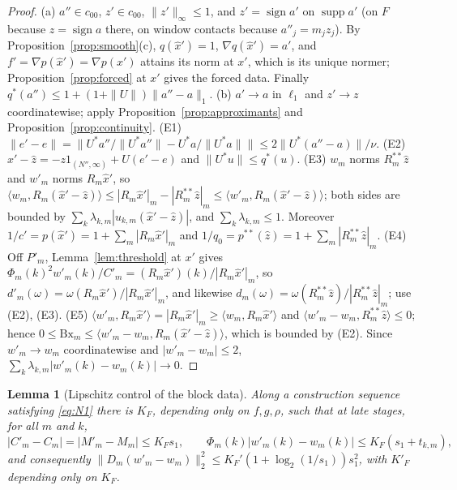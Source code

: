 \documentclass[10pt]{amsart}
\newtheorem{lemma}[theorem]{Lemma}
\theoremstyle{definition}
\theoremstyle{remark}
\newcommand{\supp}{\operatorname{supp}}
\newcommand{\sgn}{\operatorname{sign}}
\newcommand{\zh}{\hat z}
\newcommand{\ip}[2]{\langle #1,#2\rangle}
\begin{document}
\begin{proof}
(a) $a''\in c_{00}$, $z'\in c_{00}$, $\|z'\|_\infty\le1$, and $z'=\sgn a'$ on
$\supp a'$ (on $F$ because $z=\sgn a$ there, on window contacts because
$a''_j=m_jz_j$).  By Proposition~\ref{prop:smooth}(c), $q(\hat x')=1$,
$\nabla q(\hat x')=a'$, and $f'=\nabla p(\hat x')=\nabla p(x')$ attains its
norm at $x'$, which is its unique normer; Proposition~\ref{prop:forced} at
$x'$ gives the forced data.  Finally $q^*(a'')\le1+(1+\|U\|)\|a''-a\|_1$.
(b) $a'\to a$ in $\ell_1$ and $z'\to z$ coordinatewise; apply
Proposition~\ref{prop:approximants} and Proposition~\ref{prop:continuity}.
(E1) $\|e'-e\|=\|U^*a''/\|U^*a''\|-U^*a/\|U^*a\|\|\le2\|U^*(a''-a)\|/\nu$.
(E2) $\hat x'-\zh=-z1_{(N'',\infty)}+U(e'-e)$ and $\|U^*u\|\le q^*(u)$.
(E3) $w_m$ norms $R_m^{**}\zh$ and $w'_m$ norms $R_m\hat x'$, so
$\ip{w_m}{R_m(\hat x'-\zh)}\le|R_m\hat x'|_m-|R^{**}_m\zh|_m\le
\ip{w'_m}{R_m(\hat x'-\zh)}$; both sides are bounded by
$\sum_k\lambda_{k,m}|u_{k,m}(\hat x'-\zh)|$, and $\sum_k\lambda_{k,m}\le1$.
Moreover $1/c'=p(\hat x')=1+\sum_m|R_m\hat x'|_m$ and $1/q_0=p^{**}(\zh)=
1+\sum_m|R^{**}_m\zh|_m$.
(E4) Off $P'_m$, Lemma~\ref{lem:threshold} at $x'$ gives
$\Phi_m(k)^2w'_m(k)/C'_m=(R_m\hat x')(k)/|R_m\hat x'|_m$, so
$d'_m(\omega)=\omega(R_m\hat x')/|R_m\hat x'|_m$, and likewise
$d_m(\omega)=\omega(R^{**}_m\zh)/|R^{**}_m\zh|_m$; use (E2), (E3).
(E5) $\ip{w'_m}{R_m\hat x'}=|R_m\hat x'|_m\ge\ip{w_m}{R_m\hat x'}$ and
$\ip{w'_m-w_m}{R_m^{**}\zh}\le0$; hence $0\le\mathrm{Bx}_m\le
\ip{w'_m-w_m}{R_m(\hat x'-\zh)}$, which is bounded by (E2).  Since
$w'_m\to w_m$ coordinatewise and $|w'_m-w_m|\le2$,
$\sum_k\lambda_{k,m}|w'_m(k)-w_m(k)|\to0$.
\end{proof}

\begin{lemma}[Lipschitz control of the block data]\label{lem:F1}
Along a construction sequence satisfying \eqref{eq:N1} there is $K_F$,
depending only on $f,g,\rho$, such that at late stages, for all $m$ and $k$,
\[
 |C'_m-C_m|=|M'_m-M_m|\le K_Fs_1,\qquad
 \Phi_m(k)|w'_m(k)-w_m(k)|\le K_F(s_1+t_{k,m}),
\]
and consequently $\|D_m(w'_m-w_m)\|_2^2\le K_F'(1+\log_2(1/s_1))s_1^2$, with
$K'_F$ depending only on $K_F$.
\end{lemma}
\end{document}
